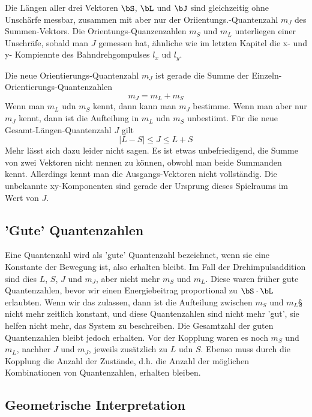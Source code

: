 Die Längen aller drei Vektoren $\bS$, $\bL$ und $\bJ$ sind gleichzeitig ohne Unschärfe messbar, zusammen mit aber nur der Oriientungs.-Quantenzahl $m_J$ des Summen-Vektors. Die Orientungs-Quanzenzahlen $m_S$ und $m_L$ unterliegen einer Unschräfe, sobald man $J$ gemessen hat, ähnliche wie im letzten Kapitel die x- und y- Kompiennte des Bahndrehgompulses $l_x$ ud $l_y$.

Die neue Orientierungs-Quantenzahl $m_J$ ist gerade die Summe der Einzeln-Orientierungs-Quantenzahlen
\begin{equation}
 m_J  = m_L + m_S
\end{equation}
Wenn man $m_L$ udn $m_S$ kennt, dann kann man $m_J$ bestimme. Wenn man aber nur $m_J$ kennt, dann ist die Aufteilung in $m_L$ udn $m_S$  unbestiimt.  Für die  neue Gesamt-Längen-Quantenzahl $J$ gilt
\begin{equation}
 | L - S | \le J \le  L + S
\end{equation}
Mehr lässt sich dazu leider nicht sagen. Es ist etwas unbefriedigend, die Summe von zwei Vektoren nicht nennen zu können, obwohl man beide Summanden kennt. Allerdings kennt man die Ausgangs-Vektoren nicht vollständig. Die unbekannte xy-Komponenten sind gerade der Ursprung dieses Spielraums im Wert von $J$.

\subsection{'Gute' Quantenzahlen}

Eine Quantenzahl wird als 'gute' Quantenzahl bezeichnet, wenn sie eine Konstante der Bewegung ist, also erhalten bleibt. Im Fall der Drehimpulsaddition sind dies $L$, $S$, $J$ und $m_J$, aber nicht mehr $m_S$ und $m_L$. Diese waren früher gute Quantenzahlen, bevor wir einen Energiebeitrag proportional zu $\bS \cdot \bL$ erlaubten. Wenn wir das zulassen, dann ist die Aufteilung zwischen $m_S$ und $m_L$§ nicht mehr zeitlich konstant, und diese Quantenzahlen sind nicht mehr 'gut', sie helfen nicht mehr, das System zu beschreiben. Die Gesamtzahl der guten Quantenzahlen bleibt jedoch erhalten. Vor der Kopplung waren es noch $m_S$ und $m_L$, nachher $J$ und $m_J$, jeweils zusätzlich zu $L$ udn $S$. Ebenso muss durch die Kopplung die Anzahl der Zustände, d.h. die Anzahl der möglichen Kombinationen von Quantenzahlen, erhalten bleiben.



\subsection{Geometrische Interpretation}

